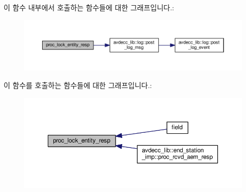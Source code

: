 이 함수 내부에서 호출하는 함수들에 대한 그래프입니다.\+:
\nopagebreak
\begin{figure}[H]
\begin{center}
\leavevmode
\includegraphics[width=350pt]{classavdecc__lib_1_1descriptor__base__imp_a6cd2b73ea95b18f07dbdc251140679b0_cgraph}
\end{center}
\end{figure}




이 함수를 호출하는 함수들에 대한 그래프입니다.\+:
\nopagebreak
\begin{figure}[H]
\begin{center}
\leavevmode
\includegraphics[width=350pt]{classavdecc__lib_1_1descriptor__base__imp_a6cd2b73ea95b18f07dbdc251140679b0_icgraph}
\end{center}
\end{figure}


